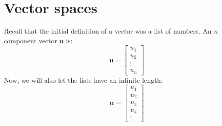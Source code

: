 \documentclass{article}
\begin{document}
\section*{Vector spaces}

Recall that the initial definition of a vector was a list of numbers. An \(n\) component vector \(\mathbf{u}\) is: 
\[\mathbf{u} = \begin{bmatrix} u_1 \\ u_2 \\ \vdots \\ u_n \end{bmatrix}\]
Now, we will also let the lists have an infinite length: 
\[\mathbf{u} = \begin{bmatrix} u_1 \\ u_2 \\ u_3 \\ u_4 \\ \vdots \end{bmatrix}\]
\end{document}

